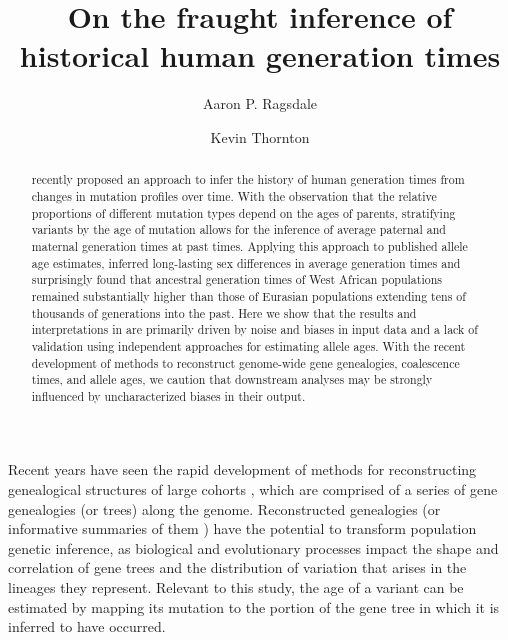 \documentclass[]{article}
\begin{document}
\title{On the fraught inference of historical human generation times}
\author[1,*]{Aaron P. Ragsdale}
\author[2]{Kevin Thornton}
\maketitle

\begin{abstract}

    \noindent \citet{wang2023human} recently proposed an approach to infer the
    history of human generation times from changes in mutation profiles over
    time. With the observation that the relative proportions of different
    mutation types depend on the ages of parents, stratifying variants by the
    age of mutation allows for the inference of average paternal and maternal
    generation times at past times. Applying this approach to published allele
    age estimates, \citet{wang2023human} inferred long-lasting sex
    differences in average generation times and surprisingly found that
    ancestral generation times of West African populations remained
    substantially higher than those of Eurasian populations extending tens of
    thousands of generations into the past. Here we show that the results and
    interpretations in \citet{wang2023human} are primarily driven by noise and
    biases in input data and a lack of validation using independent approaches
    for estimating allele ages. With the recent development of methods to
    reconstruct genome-wide gene genealogies, coalescence times, and allele
    ages, we caution that downstream analyses may be strongly influenced by
    uncharacterized biases in their output.

\end{abstract}

Recent years have seen the rapid development of methods for reconstructing
genealogical structures of large cohorts
\citep{speidel2019method,wohns2022unified,hubisz2020mapping}, which are
comprised of a series of gene genealogies (or trees) along the genome.
Reconstructed genealogies (or informative summaries of them
\citep{albers2020dating}) have the potential to transform population genetic
inference, as biological and evolutionary processes impact the shape and
correlation of gene trees and the distribution of variation that arises in the
lineages they represent. Relevant to this study, the age of a variant can be
estimated by mapping its mutation to the portion of the gene tree in which it
is inferred to have occurred.
\end{document}
